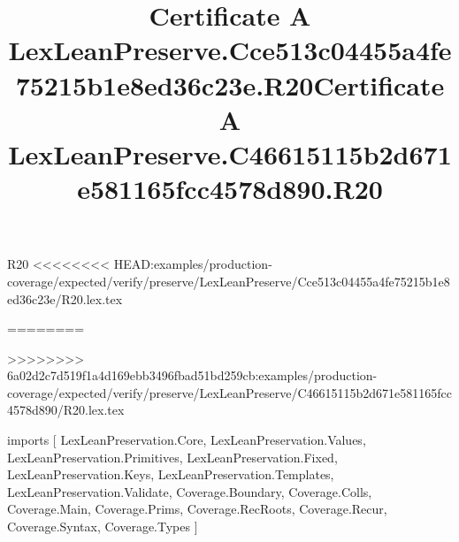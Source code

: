 \begin{lexlean}{R20}
<<<<<<<< HEAD:examples/production-coverage/expected/verify/preserve/LexLeanPreserve/Cce513c04455a4fe75215b1e8ed36c23e/R20.lex.tex
\title{Certificate A LexLeanPreserve.Cce513c04455a4fe75215b1e8ed36c23e.R20}
========
\title{Certificate A LexLeanPreserve.C46615115b2d671e581165fcc4578d890.R20}
>>>>>>>> 6a02d2c7d519f1a4d169ebb3496fbad51bd259cb:examples/production-coverage/expected/verify/preserve/LexLeanPreserve/C46615115b2d671e581165fcc4578d890/R20.lex.tex
\begin{coremodule}
imports [
  LexLeanPreservation.Core,
  LexLeanPreservation.Values,
  LexLeanPreservation.Primitives,
  LexLeanPreservation.Fixed,
  LexLeanPreservation.Keys,
  LexLeanPreservation.Templates,
  LexLeanPreservation.Validate,
  Coverage.Boundary,
  Coverage.Colls,
  Coverage.Main,
  Coverage.Prims,
  Coverage.RecRoots,
  Coverage.Recur,
  Coverage.Syntax,
  Coverage.Types
]


\end{coremodule}
\end{lexlean}
